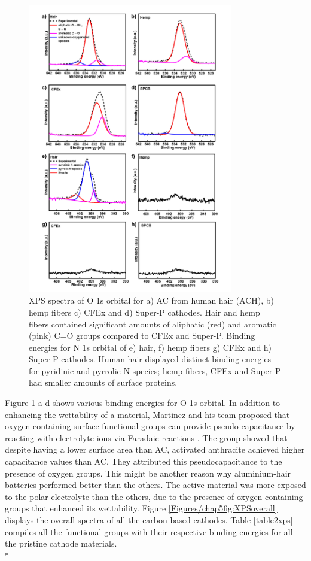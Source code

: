 \begin{figure}[h!]
  \centering
  \includegraphics[width=0.8\textwidth]{Figures/chap5fig/XPSON}
    \caption{XPS spectra of O 1s orbital for a) AC from human hair (ACH), b) hemp fibers c) CFEx and d) Super-P cathodes. Hair and hemp fibers contained significant amounts of aliphatic (red) and aromatic (pink) C=O groups  compared to CFEx and Super-P. Binding energies for N 1s orbital of e) hair, f) hemp fibers g) CFEx and h) Super-P cathodes. Human hair displayed distinct binding energies for pyridinic and pyrrolic N-species; hemp fibers, CFEx and Super-P had smaller amounts of surface proteins.}
  \label{Figures/chap5fig:XPSON}
\end{figure}

Figure \ref{Figures/chap5fig:XPSON} a-d shows various binding energies for O 1s orbital. In addition to enhancing the wettability of a material, Martinez and his team proposed that oxygen-containing surface functional groups can provide pseudo-capacitance by reacting with electrolyte ions  via Faradaic reactions \cite{li_effect_2011, oh_oxygen_2014,bleda-martinez_role_2005}. The group showed that despite having a lower surface area than AC, activated anthracite achieved higher capacitance values than AC. They attributed this pseudocapacitance to the presence of oxygen groups. This might be another reason why aluminium-hair batteries performed better than the others. The active material was more exposed to the polar electrolyte than the others, due to the presence of oxygen containing groups that enhanced its wettability. Figure \ref{Figures/chap5fig:XPSoverall} displays the overall spectra of all the carbon-based cathodes. Table \ref{table2xps} compiles all the functional groups with their respective binding energies for all the pristine cathode materials. \\*

